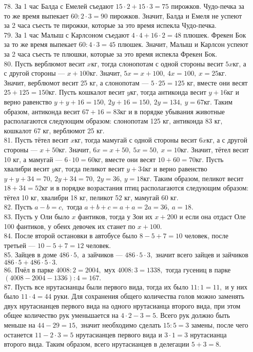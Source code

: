 78. За 1 час Балда с Емелей съедают $15\cdot2+15\cdot3=75$ пирожков. Чудо-печка за то же время выпекает $60:2\cdot3=90$ пирожков. Значит, Балда и Емеля не успеют за 2 часа съесть те пирожки, которые за это время испекла Чудо-печка.\\
79. За 1 час Малыш с Карлсоном съедают $4\cdot4+16\cdot2=48$ плюшек. Фрекен Бок за то же время выпекает $60:4\cdot3=45$ плюшек. Значит, Малыш и Карлсон успеют за 2 часа съесть те плюшки, которые за это время испекла Фрекен Бок.\\
80. Пусть верблюмот весит $x$кг, тогда слонопотам с одной стороны весит $5x$кг, а с другой стороны --- $x+100$кг. Значит, $5x=x+100,\ 4x=100,\ x=25$кг. Значит, верблюмот весит 25 кг, а слонопотам --- $5\cdot25=125$ кг, вместе они весят $25+125=150$кг. Пусть кошкалот весит $y$кг, тогда антиконда весит $y+16$кг и верно равенство $y+y+16=150,\ 2y+16=150,\ 2y=134,\ y=67$кг. Таким образом, антиконда весит $67+16=83$кг и в порядке убывания животные располагаются следующим образом: слонопотам 125 кг, антиконда 83 кг, кошкалот 67 кг, верблюмот 25 кг.\\
81. Пусть тётел весит $x$кг, тогда мамугай с одной стороны весит $6x$кг, а с другой стороны --- $x+50$кг. Значит, $6x=x+50,\ 5x=50,\ x=10$кг. Значит, тётел весит 10 кг, а мамугай --- $6\cdot10=60$кг, вместе они весят $10+60=70$кг. Пусть хвалибри весит $y$кг, тогда пеликот весит $y+34$кг и верно равенство $y+y+34=70,\ 2y+34=70,\ 2y=36,\ y=18$кг. Таким образом, пеликот весит $18+34=52$кг и в порядке возрастания птиц располагаются следующим образом: тётел 10 кг, хвалибри 18 кг, пеликот 52 кг, мамугай 60 кг.\\
82. Пусть $a-b=c,$ тогда $a+b+c=a+a=2a=36,\ a=18.$\\
83. Пусть у Оли было $x$ фантиков, тогда у Зои их $x+200$ и если она отдаст Оле 100 фантиков, у обеих девочек их станет по $x+100.$\\
84. После второй остановки в автобусе было $8-5+7=10$ человек, после третьей --- $10-5+7=12$ человек.\\
85. Зайцев в доме $486\cdot5,$ а зайчиков --- $486\cdot5\cdot3,$ значит всего зайцев и зайчиков $486\cdot5+486\cdot5\cdot3.$\\
86. Пчёл в парке $4008:2=2004,$ мух $4008:3=1338,$ тогда гусениц в парке $(4008-2004-1336):4=167.$\\
87. Пусть все нрутасианцы были первого вида, тогда их было $11:1=11,$ и у них было $11\cdot4=44$ руки. Для сохранения общего количества голов можно заменять двух нрутасианцев первого вида на одного нрутасианца второго вида, при этом общее количество рук уменьшается на $4\cdot2-3=5.$ Всего рук должно быть меньше на  $44-29=15,$ значит необходимо сделать $15:5=3$ замены, после чего останется $11-2\cdot3=5$ нрутасианцев первого вида и $3\cdot1=3$ нрутасианца второго вида. Таким образом, всего нрутасианцев в делегации $5+3=8.$\\
